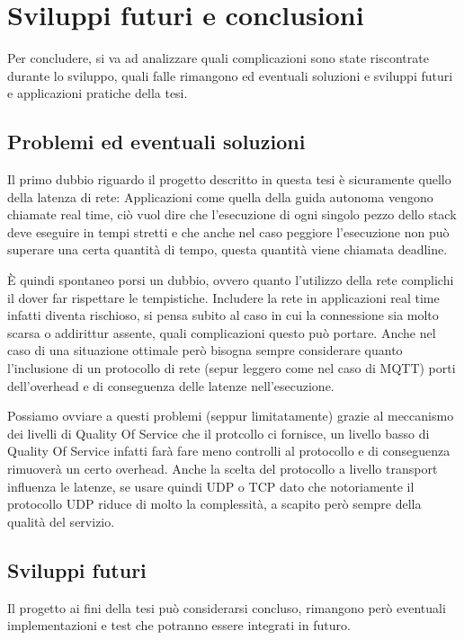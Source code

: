 \section{Sviluppi futuri e conclusioni}
Per concludere, si va ad analizzare quali complicazioni sono state riscontrate durante lo sviluppo, quali falle rimangono ed eventuali soluzioni e sviluppi futuri e applicazioni pratiche della tesi.

\subsection{Problemi ed eventuali soluzioni}
Il primo dubbio riguardo il progetto descritto in questa tesi è sicuramente quello della latenza di rete: Applicazioni come quella della guida autonoma vengono chiamate real time, ciò vuol dire che l'esecuzione di ogni singolo pezzo dello stack deve eseguire in tempi stretti e che anche nel caso peggiore l'esecuzione non può superare una certa quantità di tempo, questa quantità viene chiamata deadline.  

\noindent È quindi spontaneo porsi un dubbio, ovvero quanto l'utilizzo della rete complichi il dover far rispettare le tempistiche. Includere la rete in applicazioni real time infatti diventa rischioso, si pensa subito al caso in cui la connessione sia molto scarsa o addirittur assente, quali complicazioni questo può portare. Anche nel caso di una situazione ottimale però bisogna sempre considerare quanto l'inclusione di un protocollo di rete (sepur leggero come nel caso di MQTT) porti dell'overhead e di conseguenza delle latenze nell'esecuzione.

\noindent Possiamo ovviare a questi problemi (seppur limitatamente) grazie al meccanismo dei livelli di Quality Of Service che il protcollo ci fornisce, un livello basso di Quality Of Service infatti farà fare meno controlli al protocollo e di conseguenza rimuoverà un certo overhead. Anche la scelta del protocollo a livello transport influenza le latenze, se usare quindi UDP o TCP dato che notoriamente il protocollo UDP riduce di molto la complessità, a scapito però sempre della qualità del servizio.

\subsection{Sviluppi futuri}
Il progetto ai fini della tesi può considerarsi concluso, rimangono però eventuali implementazioni e test che potranno essere integrati in futuro.

